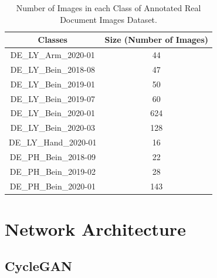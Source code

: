 \begin{center}
    \begin{table}[H]
    \begin{center}
    \begin{tabular}{||c c||} 
    \hline
    \textbf{Classes} & \textbf{Size (Number of Images)}\\ [0.5ex] 
    \hline\hline
    DE\_LY\_Arm\_2020-01 & 44 \\ 
    \hline
    DE\_LY\_Bein\_2018-08 & 47 \\
    \hline
    DE\_LY\_Bein\_2019-01 & 50 \\
    \hline
    DE\_LY\_Bein\_2019-07&  60\\
    \hline
    DE\_LY\_Bein\_2020-01&  624\\
    \hline
    DE\_LY\_Bein\_2020-03&  128\\
    \hline
    DE\_LY\_Hand\_2020-01&  16\\
    \hline
    DE\_PH\_Bein\_2018-09&  22\\
    \hline
    DE\_PH\_Bein\_2019-02&  28\\
    \hline    
    DE\_PH\_Bein\_2020-01&  143\\
    \hline    
    \end{tabular}
    \end{center}
    \caption[Number of Images in each Class of Annotated Real Document Images Dataset.]{Number of Images in each Class of Annotated Real Document Images Dataset.}
    \label{table:testdataset}
    \end{table}
\end{center}


\section{Network Architecture}\label{NetworkArchitecture}

\subsection{\ac{CycleGAN}}

